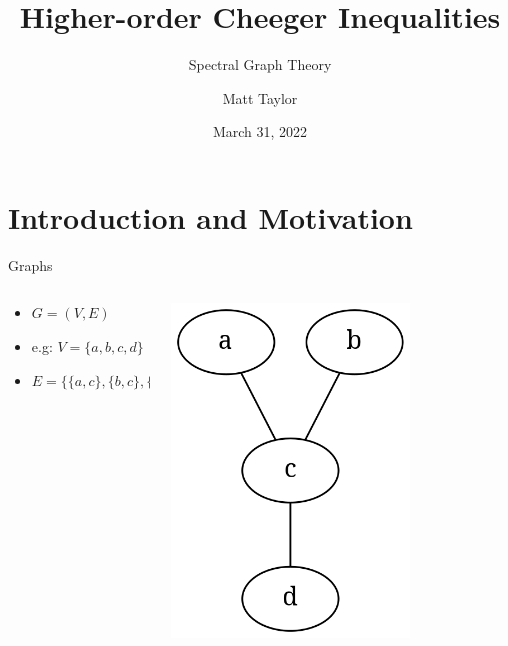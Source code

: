 \documentclass[aspectratio=169,xcolor=dvipsnames]{beamer}
\title[Higher-order Cheeger Inequalities]{Higher-order Cheeger Inequalities} %
\subtitle{Spectral Graph Theory}
\author[Taylor]{Matt Taylor}
\institute[UoB] %
{
    University of Bristol
}
\date{March 31, 2022} %
\begin{document}
\begin{frame}
    \titlepage
\end{frame}

\section{Introduction and Motivation}


\begin{frame}[c]{Graphs}
\begin{columns}

\begin{column}{0.6\textwidth}
\begin{center}
\begin{itemize}
\Large
\item $G = (V, E)$
\pause \item e.g: $V = \{a, b, c, d\}$ 
\Large
\item[] \hspace{1.7em} $E = \{ \{a, c\}, \{b, c\}, \{c, d\} \}$
\end{itemize}
\end{center}
\end{column}

\begin{column}{0.4\textwidth}
\centering
\hspace{-5em}
\pause \includegraphics[width=0.7\textwidth]{graph-simple}
\end{column}

\end{columns}
\end{frame}
\end{document}
